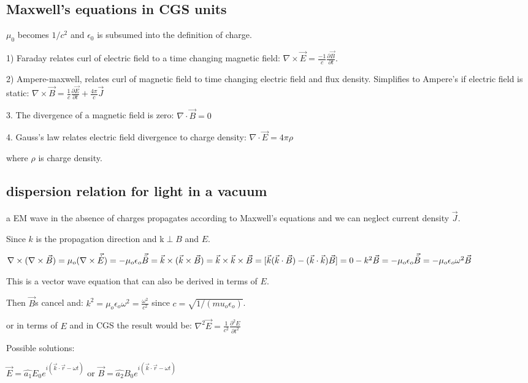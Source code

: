 \documentclass[12pt]{report}
\begin{document}
\subsection{Maxwell's equations in CGS units}  
$\mu_0$ becomes $1/c^2$ and $\epsilon_0$ is subsumed into the definition of charge.

1) Faraday relates curl of electric field to a time changing magnetic field: $\nabla \times \vec{E} = \frac{-1}{c}\frac{\partial \vec{B}}{\partial t}$.

2) Ampere-maxwell, relates curl of magnetic field to time changing electric field and flux density. Simplifies to Ampere's if electric field is static:
 $\nabla \times \vec{B} =\frac{1}{c} \frac{\partial \vec{E}}{\partial t}+\frac{4\pi}{c}\vec{J}$

3. The divergence of a magnetic field is zero: $\nabla \cdot \vec{B}=0$

4. Gauss's law relates electric field divergence to charge density: $\nabla \cdot \vec{E}=4\pi\rho$

where $\rho$ is charge density.

\subsection{dispersion relation for light in a vacuum}
a EM wave in the absence of charges propagates according to Maxwell's equations and we can neglect current density $\vec{J}$.

  Since $k$ is the propagation direction and k$ \perp B$ and $E$.
  
$\nabla \times(\nabla \times \vec{B})=\mu_o(\nabla \times \vec{\dot{E}})=-\mu_o\epsilon_o \vec{\ddot{B}}=\vec{k}\times(\vec{k} \times \vec{B}) \\
=\vec{k}\times\vec{k} \times \vec{B}=[\vec{k}(\vec{k} \cdot \vec{B}) - (\vec{k} \cdot \vec{k})\vec{B}]=0 -k^2\vec{B}=  -\mu_o\epsilon_o \vec{\ddot{B}}= -\mu_o\epsilon_o \omega^2 \vec{B} $

This is a vector wave equation that can also be derived in terms of $E$.


Then $\vec{B}$s cancel and: $k^2=\mu_o \epsilon_o \omega^2=\frac{\omega^2}{c^2}$ since $c=\sqrt{1/(mu_o \epsilon_o)}$.

or in terms of $E$ and in CGS the result would be: $\nabla^2\vec{E}=\frac{1}{c^2}\frac{\partial^2 E}{\partial t^2}$

Possible solutions:

$\vec{E}=\hat{a_1}E_0e^{i(\vec{k}\cdot\vec{r} -\omega t)}$ or $\vec{B}=\hat{a_2}B_0e^{i(\vec{k}\cdot\vec{r} -\omega t)}$
\end{document}
